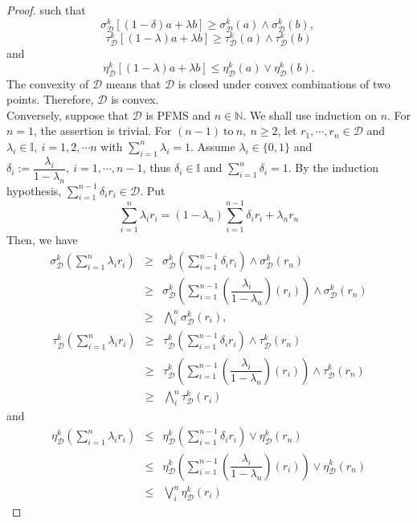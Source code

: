 \documentclass[12pt,letterpaper]{amsart}
\theoremstyle{plain}
\theoremstyle{definition}
\numberwithin{equation}{section}
\begin{document}
\begin{proof}
such that $$\sigma^k_{\mathcal{D}} [(1 - \delta) a + \lambda b] \geq \sigma^k_{\mathcal{D}}(a) \wedge \sigma^k_{\mathcal{D}}(b),~$$ $$\tau^k_{\mathcal{D}} [(1 - \lambda) a + \lambda b] \geq \tau^k_{\mathcal{D}}(a) \wedge \tau^k_{\mathcal{D}}(b)$$ and $$\eta^k_{\mathcal{D}} [(1 - \lambda) a + \lambda b] \leq \eta^k_{\mathcal{D}}(a) \vee \eta^k_{\mathcal{D}}(b).$$ The convexity of $\mathcal{D}$ means that $\mathcal{D}$ is closed under convex combinations of two points. Therefore, $\mathcal{D}$ is convex.\\ Conversely, suppose that $\mathcal{D}$ is PFMS and $n \in \mathbb{N}$. We shall use induction on $n$. For $n = 1$, the assertion is trivial. For $(n - 1)~ \text{to}~ n,~ n \geq 2$, let $r_1, \cdots, r_n \in \mathcal{D}$ and $\lambda_{i} \in \mathbb{I},~ i = 1, 2, \cdots n$ with $\sum \limits_{i=1}^{n} \lambda_i = 1$. Assume $\lambda_{i} \in \{0, 1 \}$ and $\delta_{i}:=\dfrac{\lambda_{i}}{1 - \lambda_{n}},~ i = 1, \cdots, n-1$, thus $\delta_i \in \mathbb{I}$ and $\sum \limits_{i=1}^{n} \delta_i = 1$.
By the induction hypothesis, $\sum \limits_{i=1}^{n-1} \delta_{i} r_{i} \in \mathcal{D}$. Put $$\sum \limits_{i=1}^{n} \lambda_{i} r_{i} = (1 - \lambda_{n}) \sum \limits_{i=1}^{n-1} \delta_{i} r_{i} + \lambda_{n} r_{n} $$ Then, we have
\begin{eqnarray*}
\sigma^k_{\mathcal{D}} \left(\sum \limits_{i=1}^{n} \lambda_{i} r_{i} \right)
& \geq & \sigma^k_{\mathcal{D}}(\sum \limits_{i=1}^{n-1}\delta_{i} r_{i}) \wedge \sigma^k_{\mathcal{D}}(r_n)\\
& \geq & \sigma^k_{\mathcal{D}}(\sum \limits_{i=1}^{n-1} ( \dfrac{\lambda_{i}}{1 - \lambda_{n}} )(r_{i})) \wedge \sigma^k_{\mathcal{D}}(r_n)\\
& \geq & \bigwedge_{i}^{n} \sigma^k_{\mathcal{D}} (r_i),
\end{eqnarray*}
\begin{eqnarray*}
\tau^k_{\mathcal{D}} \left(\sum \limits_{i=1}^{n} \lambda_{i} r_{i} \right) 
& \geq & \tau^k_{\mathcal{D}}(\sum \limits_{i=1}^{n-1}\delta_{i} r_{i}) \wedge \tau^k_{\mathcal{D}}(r_n)\\
& \geq & \tau^k_{\mathcal{D}}(\sum \limits_{i=1}^{n-1} ( \dfrac{\lambda_{i}}{1 - \lambda_{n}} )(r_{i})) \wedge \tau^k_{\mathcal{D}}(r_n)\\
& \geq & \bigwedge_{i}^{n} \tau^k_{\mathcal{D}} (r_i)
\end{eqnarray*} and 
\begin{eqnarray*}
\eta^k_{\mathcal{D}} \left(\sum \limits_{i=1}^{n} \lambda_{i} r_{i} \right)
& \leq & \eta^k_{\mathcal{D}}(\sum \limits_{i=1}^{n-1}\delta_{i} r_{i}) \vee \eta^k_{\mathcal{D}}(r_n)\\
& \leq & \eta^k_{\mathcal{D}}(\sum \limits_{i=1}^{n-1} ( \dfrac{\lambda_{i}}{1 - \lambda_{n}} )(r_{i})) \vee \eta^k_{\mathcal{D}}(r_n)\\
& \leq & \bigvee_{i}^{n} \eta^k_{\mathcal{D}} (r_i)
\end{eqnarray*} 
\end{proof}
\ \\
\end{document}
